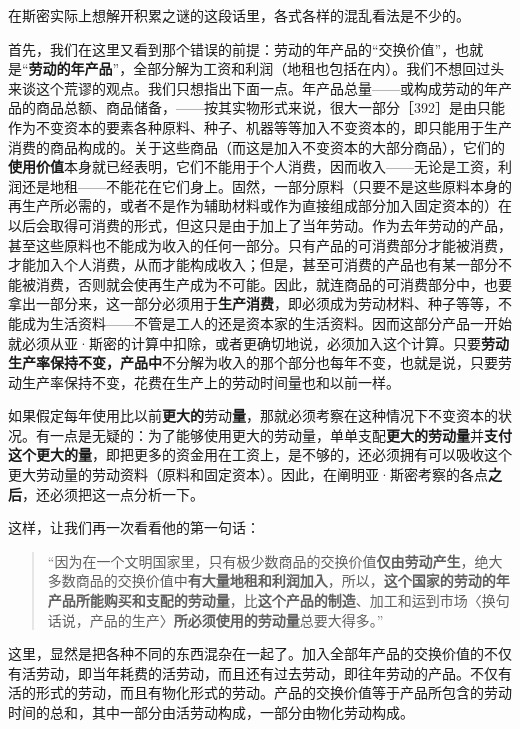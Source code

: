 在斯密实际上想解开积累之谜的这段话里，各式各样的混乱看法是不少的。

首先，我们在这里又看到那个错误的前提：劳动的年产品的“交换价值”，也就是“\textbf{劳动的年产品}”，全部分解为工资和利润（地租也包括在内）。我们不想回过头来谈这个荒谬的观点。我们只想指出下面一点。年产品总量——或构成劳动的年产品的商品总额、商品储备，——按其实物形式来说，很大一部分［392］是由只能作为不变资本的要素\fontbox{~\{}各种原料、种子、机器等等\fontbox{\}~}加入不变资本的，即只能用于生产消费的商品构成的。关于这些商品（而这是加入不变资本的大部分商品），它们的\textbf{使用价值}本身就已经表明，它们不能用于个人消费，因而收入——无论是工资，利润还是地租——不能花在它们身上。固然，一部分原料（只要不是这些原料本身的再生产所必需的，或者不是作为辅助材料或作为直接组成部分加入固定资本的）在以后会取得可消费的形式，但这只是由于加上了当年劳动。作为去年劳动的产品，甚至这些原料也不能成为收入的任何一部分。只有产品的可消费部分才能被消费，才能加入个人消费，从而才能构成收入；但是，甚至可消费的产品也有某一部分不能被消费，否则就会使再生产成为不可能。因此，就连商品的可消费部分中，也要拿出一部分来，这一部分必须用于\textbf{生产消费}，即必须成为劳动材料、种子等等，不能成为生活资料——不管是工人的还是资本家的生活资料。因而这部分产品一开始就必须从亚·斯密的计算中扣除，或者更确切地说，必须加入这个计算。只要\textbf{劳动生产率保持不变，产品中}不分解为收入的那个部分也每年不变，也就是说，只要劳动生产率保持不变，花费在生产上的劳动时间量也和以前一样。

如果假定每年使用比以前\textbf{更大的}劳动\textbf{量}，那就必须考察在这种情况下不变资本的状况。有一点是无疑的：为了能够使用更大的劳动量，单单支配\textbf{更大的劳动量}并\textbf{支付这个更大的量}，即把更多的资金用在工资上，是不够的，还必须拥有可以吸收这个更大劳动量的劳动资料（原料和固定资本）。因此，在阐明亚·斯密考察的各点\textbf{之后}，还必须把这一点分析一下。

这样，让我们再一次看看他的第一句话：

\begin{quote}“因为在一个文明国家里，只有极少数商品的交换价值\textbf{仅由劳动产生}，绝大多数商品的交换价值中\textbf{有大量地租和利润加入}，所以，\textbf{这个国家的劳动的年产品所能购买和支配的劳动量}，比\textbf{这个产品的制造}、加工和运到市场〈换句话说，产品的生产〉\textbf{所必须使用的劳动量}总要大得多。”\end{quote}

这里，显然是把各种不同的东西混杂在一起了。加入全部年产品的交换价值的不仅有活劳动，即当年耗费的活劳动，而且还有过去劳动，即往年劳动的产品。不仅有活的形式的劳动，而且有物化形式的劳动。产品的交换价值等于产品所包含的劳动时间的总和，其中一部分由活劳动构成，一部分由物化劳动构成。

